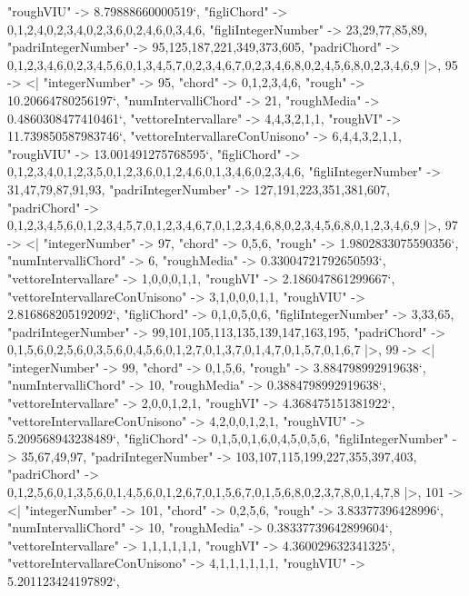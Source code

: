 \documentclass[
]{article}
\begin{document}
\begin{DatasetVerbatim}
    "roughVIU" -> 8.79888660000519`,
    "figliChord" -> {{0,1,2,4},{0,2,3,4},{0,2,3,6},{0,2,4,6},{0,3,4,6}},
    "figliIntegerNumber" -> {23,29,77,85,89},
    "padriIntegerNumber" -> {95,125,187,221,349,373,605},
    "padriChord" -> {{0,1,2,3,4,6},{0,2,3,4,5,6},{0,1,3,4,5,7},{0,2,3,4,6,7},{0,2,3,4,6,8},{0,2,4,5,6,8},{0,2,3,4,6,9}}
  |>,
  95 -> <|
    "integerNumber" -> 95,
    "chord" -> {0,1,2,3,4,6},
    "rough" -> 10.20664780256197`,
    "numIntervalliChord" -> 21,
    "roughMedia" -> 0.4860308477410461`,
    "vettoreIntervallare" -> {4,4,3,2,1,1},
    "roughVI" -> 11.739850587983746`,
    "vettoreIntervallareConUnisono" -> {6,4,4,3,2,1,1},
    "roughVIU" -> 13.001491275768595`,
    "figliChord" -> {{0,1,2,3,4},{0,1,2,3,5},{0,1,2,3,6},{0,1,2,4,6},{0,1,3,4,6},{0,2,3,4,6}},
    "figliIntegerNumber" -> {31,47,79,87,91,93},
    "padriIntegerNumber" -> {127,191,223,351,381,607},
    "padriChord" -> {{0,1,2,3,4,5,6},{0,1,2,3,4,5,7},{0,1,2,3,4,6,7},{0,1,2,3,4,6,8},{0,2,3,4,5,6,8},{0,1,2,3,4,6,9}}
  |>,
  97 -> <|
    "integerNumber" -> 97,
    "chord" -> {0,5,6},
    "rough" -> 1.9802833075590356`,
    "numIntervalliChord" -> 6,
    "roughMedia" -> 0.33004721792650593`,
    "vettoreIntervallare" -> {1,0,0,0,1,1},
    "roughVI" -> 2.186047861299667`,
    "vettoreIntervallareConUnisono" -> {3,1,0,0,0,1,1},
    "roughVIU" -> 2.816868205192092`,
    "figliChord" -> {{0,1},{0,5},{0,6}},
    "figliIntegerNumber" -> {3,33,65},
    "padriIntegerNumber" -> {99,101,105,113,135,139,147,163,195},
    "padriChord" -> {{0,1,5,6},{0,2,5,6},{0,3,5,6},{0,4,5,6},{0,1,2,7},{0,1,3,7},{0,1,4,7},{0,1,5,7},{0,1,6,7}}
  |>,
  99 -> <|
    "integerNumber" -> 99,
    "chord" -> {0,1,5,6},
    "rough" -> 3.884798992919638`,
    "numIntervalliChord" -> 10,
    "roughMedia" -> 0.3884798992919638`,
    "vettoreIntervallare" -> {2,0,0,1,2,1},
    "roughVI" -> 4.368475151381922`,
    "vettoreIntervallareConUnisono" -> {4,2,0,0,1,2,1},
    "roughVIU" -> 5.209568943238489`,
    "figliChord" -> {{0,1,5},{0,1,6},{0,4,5},{0,5,6}},
    "figliIntegerNumber" -> {35,67,49,97},
    "padriIntegerNumber" -> {103,107,115,199,227,355,397,403},
    "padriChord" -> {{0,1,2,5,6},{0,1,3,5,6},{0,1,4,5,6},{0,1,2,6,7},{0,1,5,6,7},{0,1,5,6,8},{0,2,3,7,8},{0,1,4,7,8}}
  |>,
  101 -> <|
    "integerNumber" -> 101,
    "chord" -> {0,2,5,6},
    "rough" -> 3.83377396428996`,
    "numIntervalliChord" -> 10,
    "roughMedia" -> 0.38337739642899604`,
    "vettoreIntervallare" -> {1,1,1,1,1,1},
    "roughVI" -> 4.360029632341325`,
    "vettoreIntervallareConUnisono" -> {4,1,1,1,1,1,1},
    "roughVIU" -> 5.201123424197892`,

\end{DatasetVerbatim}
\end{document}
